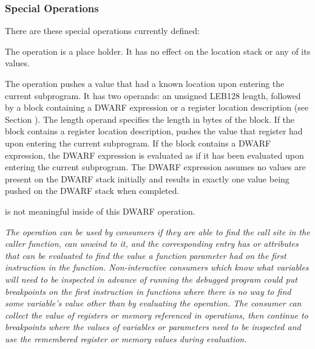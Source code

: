 \subsubsection{Special Operations}
\label{chap:specialoperations}
There 
are these special operations currently defined:
\begin{enumerate}[1. ]
\itembfnl{\DWOPnopNAME}
The \DWOPnopTARG{} operation is a place holder. It has no effect
on the location stack or any of its values.

\itembfnl{\DWOPentryvalueNAME}
The \DWOPentryvalueTARG{} operation pushes a value that had a known location
upon entering the current subprogram.  It has two operands: an 
unsigned LEB128 length, followed by 
a block containing a DWARF expression or a register location description 
(see Section ).  
The length operand specifies the length
in bytes of the block.  If the block contains a register location
description, \DWOPentryvalueNAME{} pushes the value that register had upon
entering the current subprogram.  If the block contains a DWARF expression,
the DWARF expression is evaluated as if it has been evaluated upon entering
the current subprogram.  The DWARF expression 
\bb
assumes no values are present on the DWARF stack initially and results
\eb
in exactly one
value being pushed on the DWARF stack when completed.
\bb\eb 

\DWOPpushobjectaddress{} is not meaningful inside of this DWARF operation.

\textit{The \DWOPentryvalueNAME{} operation can be used by consumers if they are able
to find the call site in the caller function, can unwind to it, and the corresponding
\DWTAGcallsiteparameter{} entry has \DWATcallvalue{} or
\DWATcalldatavalue{} attributes that can be evaluated to find the
value a function parameter had on the first instruction in the function.
Non-interactive consumers which know what variables will need to be
inspected in advance of running the debugged program could put breakpoints
on the first instruction in functions where there is no way to find
some variable's value other than by evaluating the \DWOPentryvalueNAME{} 
operation.  The consumer can collect the value of registers or 
memory referenced in
\DWOPentryvalueNAME{} operations, then continue to breakpoints where the values
of variables or parameters need to be inspected and use the remembered
register or memory values during \DWOPentryvalueNAME{} evaluation.}

\end{enumerate}

